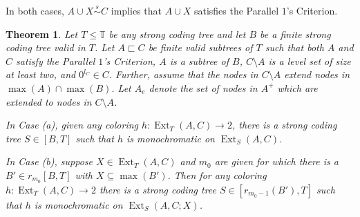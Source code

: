 \documentclass{amsart}
\newtheorem{thm}{Theorem}[section]
\theoremstyle{remark}
\theoremstyle{definition}
\theoremstyle{remark}
\newcommand{\sse}{\subseteq}
\DeclareMathOperator{\Ext}{Ext}
\newcommand{\bT}{\mathbb{T}}
\newcommand{\ssim}{\stackrel{s}{\sim}}
\newcommand{\ra}{\rightarrow}
\newcommand{\POC}{Parallel $1$'s Criterion}
\begin{document}
In both cases, $A\cup X\ssim C$ implies that $A\cup X$ satisfies the \POC.



\begin{thm}\label{thm.matrixHL}
Let $T\le \bT$ be  any strong coding tree and let  $B$ be a finite strong coding tree  valid in  $T$.
Let
 $A\sqsubset C$   be finite valid subtrees of $T$ such that both $A$ and $C$ satisfy the \POC,
$A$ is a subtree of $B$,
$C\setminus A$ is a level set of size at least two,
and
$0^{l_C}\in C$.
Further, assume that
the nodes in $C\setminus A$ extend nodes in $\max(A)\cap\max(B)$.
Let $A_e$ denote the set of  nodes in $A^+$ which are extended to nodes in $C\setminus A$.



In Case (a),
given any coloring $h:\Ext_T(A,C)\ra 2$,
 there is a strong coding tree $S\in [B,T]$ such that
$h$ is monochromatic on $\Ext_S(A,C)$.



In Case (b),  suppose
 $X\in \Ext_T(A,C)$  and
$m_0$ are given
for which there is a $B'\in r_{m_0}[B,T]$ with
$X\sse\max(B')$.
Then for any
 coloring $h:\Ext_T(A,C)\ra 2$
there is a strong coding tree $S\in [r_{m_0-1}(B'),T]$ such that
 $h$ is monochromatic on $\Ext_S(A,C;X)$.
\end{thm}
\end{document}
